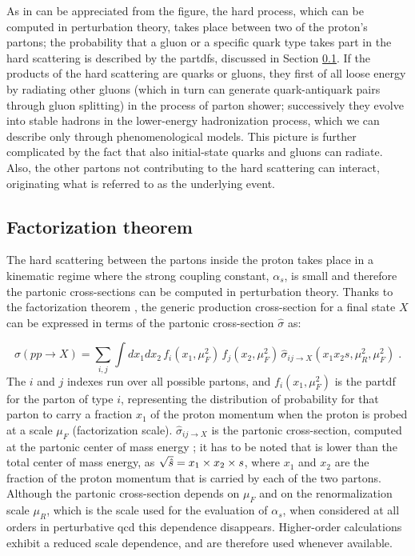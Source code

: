 As in can be appreciated from the figure, the hard process, which can be computed in perturbation theory, takes place between two of the proton's partons; the probability that a gluon or a specific quark type takes part in the hard scattering is described by the \glspl{partdf}, discussed in Section \ref{sec:ppint:hardscatter}. If the products of the hard scattering are quarks or gluons, they first of all loose energy by radiating other gluons (which in turn can generate quark-antiquark pairs through gluon splitting) in the process of parton shower;
successively they evolve into stable hadrons in the lower-energy hadronization process, which we can describe only through phenomenological models.
This picture is further complicated by the fact that also initial-state quarks and gluons can radiate. Also, the other partons not contributing to the hard scattering can interact, originating what is referred to as the underlying event. 

\subsection{Factorization theorem}
\label{sec:ppint:hardscatter}

The hard scattering between the partons inside the proton takes place in a kinematic regime where the strong coupling constant, $\alpha_s$, 
is small and therefore the partonic cross-sections can be computed in perturbation theory. 
Thanks to the factorization theorem \cite{doi:10.1146}, the generic production cross-section for a final state $X$ can be expressed in terms of the partonic cross-section $\hat\sigma$ as:

\begin{equation}
  \sigma(pp\rightarrow X) = \sum_{i,j} \int dx_1 dx_2\, 
     f_{i}(x_1,\mu_F^2)\, f_{j}(x_2,\mu_F^2)\, 
     \hat\sigma_{ij\rightarrow X}(x_1 x_2 s, \mu_R^2, \mu_F^2) \; .
  \label{eq:general-cross-section}
\end{equation}
The $i$ and $j$ indexes run over all possible partons, and $f_{i}(x_1,\mu_F^2)$ is the \gls{partdf} for the parton of type $i$, representing 
the distribution of probability for that parton to carry a fraction $x_1$ of the proton momentum when the proton is probed at a scale $\mu_F$
(factorization scale). $\hat\sigma_{ij\rightarrow X}$ is the partonic cross-section, computed at the partonic center of mass energy \cmpart;   
it has to be noted that \cmpart is lower than the total center of mass energy, as 
$\sqrt{\hat{s}} = x_1 \times x_2 \times s$, 
where $x_1$ and $x_2$ are the fraction of the proton momentum that is carried by each of the two partons.
Although the partonic cross-section depends on $\mu_F$ and on the renormalization scale $\mu_R$, 
which is the scale used for the evaluation of $\alpha_s$, 
when considered at all orders in perturbative \gls{qcd} this dependence disappears.
Higher-order calculations exhibit a reduced scale dependence, and are therefore used whenever available. 



